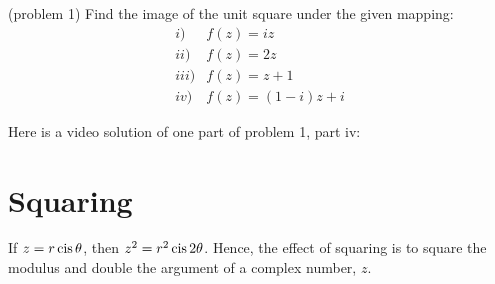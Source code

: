 \documentclass[handout]{ximera}
\begin{document}
\begin{problem}(problem 1)
Find the image of the unit square under the given mapping:
\begin{align*}
i) & f(z) = iz\\
ii) & f(z) = 2z\\
iii) & f(z) = z+1\\
iv) & f(z) = (1-i)z +i
\end{align*}
\end{problem}

Here is a video solution of one part of problem 1, part iv:\\
\begin{foldable}
\end{foldable}

\section{Squaring}

If $z = r \operatorname{cis} \theta$, then $z^2 = r^2 \operatorname{cis} 2\theta$.  
Hence, the effect of squaring is to square the modulus and double the 
argument of a complex number, $z$.
\end{document}

